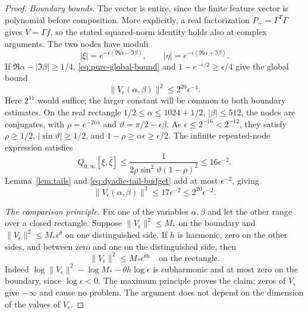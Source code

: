 \begin{proof} \emph{Boundary bounds.} The vector is entire, since the finite feature vector is
polynomial before composition. More explicitly, a real factorization
$P_+=\Gamma^T\Gamma$ gives $V=\Gamma f$, so the stated squared-norm
identity holds also at complex arguments. The two nodes have moduli
\[
 |\xi|=e^{-\epsilon(\Re\alpha-\Im\beta)},\qquad
 |\eta|=e^{-\epsilon(\Re\alpha+\Im\beta)}.
\]
If \(\Re \alpha-|\Im \beta|\ge1/4\), \eqref{eq:pure-global-bound} and
\(1-e^{-\epsilon/2}\ge\epsilon/4\) give the global bound
\begin{equation}
             \|V_\epsilon(\alpha,\beta)\|^2\le2^{20}\epsilon^{-4}.        \label{eq:continuation-global}
\end{equation}
Here \(2^{11}\) would suffice; the larger constant will be common to both
boundary estimates. On the real rectangle
\(1/2\le \alpha\le1024+1/2\), \(|\beta|\le512\), the nodes are conjugates, with
$\rho=e^{-2\epsilon\alpha}$ and $\vartheta=\pi/2-\epsilon\beta$.
As \(\epsilon\le2^{-16}<2^{-12}\), they satisfy
\(\rho\ge1/2\), \(|\sin\vartheta|\ge1/2\), and
\(1-\rho\ge \alpha\epsilon\ge\epsilon/2\). The infinite repeated-node expression satisfies
\[
 Q_{0,\infty}[\xi,\bar\xi]
 \le\frac1{2\rho\sin^2\vartheta(1-\rho)^2}\le16\epsilon^{-2}.
\]
Lemma~\ref{lem:tails} and \eqref{eq:dyadic-tail-budget} add at most $\epsilon^{-2}$, giving
\begin{equation}
 \|V_\epsilon(\alpha,\beta)\|^2\le17\epsilon^{-2}
                                      \le2^{20}\epsilon^{-2}.   \label{eq:continuation-real}
\end{equation}

\emph{The comparison principle.} Fix one of the variables
$\alpha,\beta$ and let the other range over a closed rectangle. Suppose
\(\|V_\epsilon\|^2\le M_*\) on the boundary and
\(\|V_\epsilon\|^2\le M_*\epsilon^\theta\) on one distinguished side. If
\(h\) is harmonic, zero on the other sides, and between zero and one on
the distinguished side, then
\begin{equation}
                         \|V_\epsilon\|^2\le M_*\epsilon^{\theta h}
                         \quad\text{on the rectangle}.
                                                               \label{eq:rectangle-comparison}
\end{equation}
Indeed \(\log\|V_\epsilon\|^2-\log M_*-\theta h\log\epsilon\) is
subharmonic and at most zero on the boundary, since \(\log\epsilon<0\).
The maximum principle proves the claim; zeros of \(V_\epsilon\) give
\(-\infty\) and cause no problem. The argument does not depend on the
dimension of the values of \(V_\epsilon\).


\end{proof}
